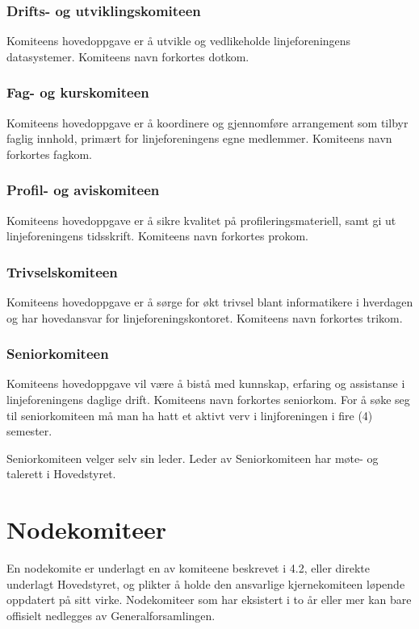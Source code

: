 \vspace{-10pt}
\subsubsection{Drifts- og utviklingskomiteen}{
Komiteens hovedoppgave er å utvikle og vedlikeholde linjeforeningens datasystemer. Komiteens navn forkortes dotkom.

}

\vspace{-10pt}
\subsubsection{Fag- og kurskomiteen}{
Komiteens hovedoppgave er å koordinere og gjennomføre arrangement som tilbyr faglig innhold, primært for linjeforeningens egne medlemmer. Komiteens navn forkortes fagkom.
}

\vspace{-10pt}
\subsubsection{Profil- og aviskomiteen}{
Komiteens hovedoppgave er å sikre kvalitet på profileringsmateriell, samt gi ut linjeforeningens tidsskrift. Komiteens navn forkortes prokom.
}

\vspace{-10pt}
\subsubsection{Trivselskomiteen}{
Komiteens hovedoppgave er å sørge for økt trivsel blant informatikere i hverdagen og har hovedansvar for linjeforeningskontoret. Komiteens navn forkortes trikom.
}

\vspace{-10pt}
\subsubsection{Seniorkomiteen}{
Komiteens hovedoppgave vil være å bistå med kunnskap, erfaring og assistanse i linjeforeningens daglige drift. Komiteens navn forkortes seniorkom. For å søke seg til seniorkomiteen må man ha hatt et aktivt verv i linjforeningen i fire (4) semester.					

Seniorkomiteen velger selv sin leder. Leder av Seniorkomiteen har møte- og talerett i Hovedstyret.
}

\vspace{-10pt}
\section{Nodekomiteer}{
En nodekomite er underlagt en av komiteene beskrevet i 4.2, eller direkte underlagt Hovedstyret, og plikter å holde den ansvarlige kjernekomiteen løpende oppdatert på sitt virke. Nodekomiteer som har eksistert i to år eller mer kan bare offisielt nedlegges av Generalforsamlingen.
}



